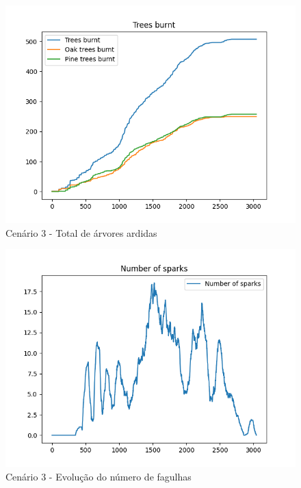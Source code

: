 \begin{figure}[H]
    \centering
    \includegraphics[width=\textwidth]{../src/runs/scenario3/trees_burnt}
    \caption{Cenário 3 - Total de árvores ardidas}
    \label{fig:S3TreesBurnt}
\end{figure}

\begin{figure}[H]
    \centering
    \includegraphics[width=\textwidth]{../src/runs/scenario3/sparks}
    \caption{Cenário 3 - Evolução do número de fagulhas}
    \label{fig:S3Sparks}
\end{figure}

